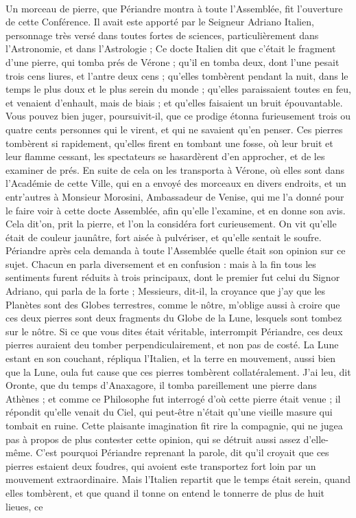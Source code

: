 \documentclass[a4paper, 11pt, oneside, polutonikogreek, french, landscape, twocolumn]{article}
\begin{document}
\setlength{\parskip}{1mm plus1mm minus1mm}
\clearpage
\Large
\pagestyle{fancy}
\fancyhf{}
\cfoot{\Fontauri{\thepage}}
\paragraph{}
Un morceau de pierre, que Périandre montra à toute l'Assemblée, fit l'ouverture de cette Conférence. Il avait este apporté par le Seigneur Adriano Italien, personnage très versé dans toutes fortes de sciences, particulièrement dans l'Astronomie, et dans l'Astrologie ; Ce docte Italien dit que c'était le fragment d'une pierre, qui tomba prés de Vérone ; qu'il en tomba deux, dont l'une pesait trois cens liures, et l'antre deux cens ; qu'elles tombèrent pendant la nuit, dans le temps le plus doux et le plus serein du monde ; qu'elles paraissaient toutes en feu, et venaient d'enhault, mais de biais ; et qu'elles faisaient un bruit épouvantable. Vous pouvez bien juger, poursuivit-il, que ce prodige étonna furieusement trois ou quatre cents personnes qui le virent, et qui ne savaient qu'en penser. Ces pierres tombèrent si rapidement, qu'elles firent en tombant une fosse, où leur bruit et leur flamme cessant, les spectateurs se hasardèrent d'en approcher, et de les examiner de prés. En suite de cela on les transporta à Vérone, où elles sont dans l'Académie de cette Ville, qui en a envoyé des morceaux en divers endroits, et un entr'autres à Monsieur Morosini, Ambassadeur de Venise, qui me l'a donné pour le faire voir à cette docte Assemblée, afin qu'elle l'examine, et en donne son avis. Cela dit'on, prit la pierre, et l'on la considéra fort curieusement. On vit qu'elle était de couleur jaunâtre, fort aisée à pulvériser, et qu'elle sentait le soufre. Périandre après cela demanda à toute l'Assemblée quelle était son opinion sur ce sujet. Chacun en parla diversement et en confusion : mais à la fin tous les sentiments furent réduits à trois principaux, dont le premier fut celui du Signor Adriano, qui parla de la forte ; Messieurs, dit-il, la croyance que j'ay que les Planètes sont des Globes terrestres, comme le nôtre, m'oblige aussi à croire que ces deux pierres sont deux fragments du Globe de la Lune, lesquels sont tombez sur le nôtre. Si ce que vous dites était véritable, interrompit Périandre, ces deux pierres auraient deu tomber perpendiculairement, et non pas de costé. La Lune estant en son couchant, répliqua l'Italien, et la terre en mouvement, aussi bien que la Lune, oula fut cause que ces pierres tombèrent collatéralement. J'ai leu, dit Oronte, que du temps d'Anaxagore, il tomba pareillement une pierre dans Athènes ; et comme ce Philosophe fut interrogé d'où cette pierre était venue ; il répondit qu'elle venait du Ciel, qui peut-être n'était qu'une vieille masure qui tombait en ruine. Cette plaisante imagination fit rire la compagnie, qui ne jugea pas à propos de plus contester cette opinion, qui se détruit aussi assez d'elle-même. C'est pourquoi Périandre reprenant la parole, dit qu'il croyait que ces pierres estaient deux foudres, qui avoient este transportez fort loin par un mouvement extraordinaire. Mais l'Italien repartit que le temps était serein, quand elles tombèrent, et que quand il tonne on entend le tonnerre de plus de huit lieues, ce 
\end{document}
